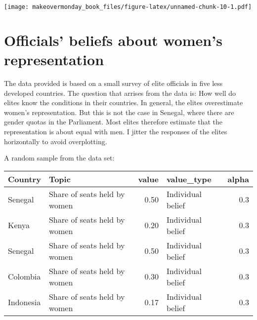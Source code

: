 \documentclass[]{book}
\theoremstyle{definition}
\theoremstyle{definition}
\theoremstyle{definition}
\theoremstyle{remark}
\begin{document}
\texttt{[image: makeovermonday\_book\_files/figure-latex/unnamed-chunk-10-1.pdf]}

\chapter{Officials' beliefs about women's
representation}\label{officials-beliefs-about-womens-representation}

The data provided is based on a small survey of elite officials in five
less developed countries. The question that arrises from the data is:
How well do elites know the conditions in their countries. In general,
the elites overestimate women's representation. But this is not the case
in Senegal, where there are gender quotas in the Parliament. Most elites
therefore estimate that the representation is about equal with men. I
jitter the responses of the elites horizontally to avoid overplotting.

A random sample from the data set:

\begin{tabular}{l|l|r|l|r}
\hline
Country & Topic & value & value\_type & alpha\\
\hline
Senegal & Share of seats held by women & 0.50 & Individual belief & 0.3\\
\hline
Kenya & Share of seats held by women & 0.20 & Individual belief & 0.3\\
\hline
Senegal & Share of seats held by women & 0.50 & Individual belief & 0.3\\
\hline
Colombia & Share of seats held by women & 0.30 & Individual belief & 0.3\\
\hline
Indonesia & Share of seats held by women & 0.17 & Individual belief & 0.3\\
\hline
\end{tabular}
\end{document}
